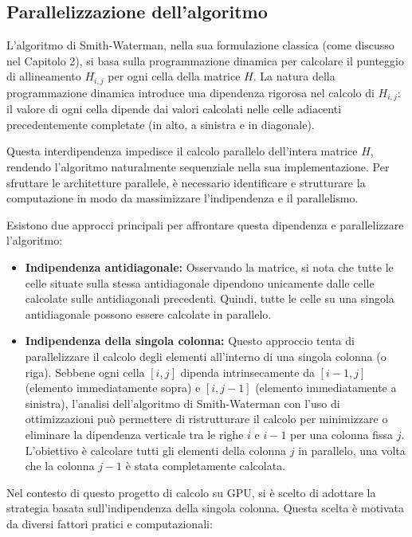 \documentclass[a4paper,12pt]{article}
\begin{document}
\subsection{Parallelizzazione dell'algoritmo}

L'algoritmo di Smith-Waterman, nella sua formulazione classica (come discusso nel Capitolo 2), si basa sulla programmazione dinamica per calcolare il punteggio di allineamento $H_{i,j}$ per ogni cella della matrice $H$.
La natura della programmazione dinamica introduce una dipendenza rigorosa nel calcolo di $H_{i,j}$: il valore di ogni cella dipende dai valori calcolati nelle celle adiacenti precedentemente completate (in alto, a sinistra e in diagonale).

Questa interdipendenza impedisce il calcolo parallelo dell'intera matrice $H$, rendendo l'algoritmo naturalmente sequenziale nella sua implementazione. Per sfruttare le architetture parallele, è necessario identificare e strutturare la computazione in modo da massimizzare l'indipendenza e il parallelismo.

Esistono due approcci principali per affrontare questa dipendenza e parallelizzare l'algoritmo:
\begin{itemize}
    \item \textbf{Indipendenza antidiagonale:} Osservando la matrice, si nota che tutte le celle situate sulla stessa antidiagonale dipendono unicamente dalle celle calcolate sulle antidiagonali precedenti. Quindi, tutte le celle su una singola antidiagonale possono essere calcolate in parallelo.
    \item \textbf{Indipendenza della singola colonna:} Questo approccio tenta di parallelizzare il calcolo degli elementi all'interno di una singola colonna (o riga). Sebbene ogni cella $[i,j]$ dipenda intrinsecamente da $[i-1, j]$ (elemento immediatamente sopra) e $[i, j-1]$ (elemento immediatamente a sinistra), l'analisi dell'algoritmo di Smith-Waterman con l'uso di ottimizzazioni può permettere di ristrutturare il calcolo per minimizzare o eliminare la dipendenza verticale tra le righe $i$ e $i-1$ per una colonna fissa $j$. L'obiettivo è calcolare tutti gli elementi della colonna $j$ in parallelo, una volta che la colonna $j-1$ è stata completamente calcolata.
\end{itemize}

Nel contesto di questo progetto di calcolo su GPU, si è scelto di adottare la strategia basata sull'indipendenza della singola colonna. Questa scelta è motivata da diversi fattori pratici e computazionali:
\end{document}
